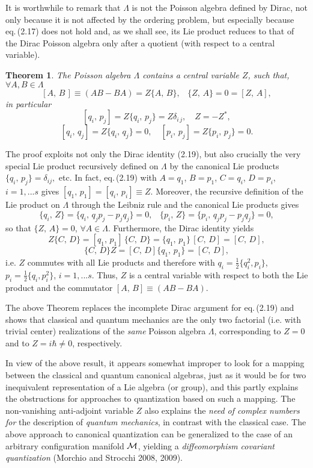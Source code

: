 \documentclass[12pt]{article}
\newtheorem{Theorem}{Theorem}[section]
\def \be {\begin{equation}}
\def \ee {\end{equation}}
\def \ume {{\scriptstyle{\frac{1}{2}}}}
\def \eqq {\equiv}
\def \M {{\cal M}}
\begin{document}
It is worthwhile to remark that $\Lambda$ is not the Poisson algebra defined by Dirac, not only because it is not affected by the ordering problem, but especially  because eq.\,(2.17) does not hold and, as we shall see,  its   Lie product reduces to that of the Dirac Poisson algebra only after  a quotient (with respect to a central variable). 
 
 \begin{Theorem} The Poisson algebra $\Lambda$ contains a central variable $Z $, such that, $\forall A, B \in \Lambda$ 
\be{ [ A, \,B \,] \eqq (A B - B A) = Z \{ A, \,B \}, \,\,\,\,\,\{ Z, \,A \} = 0 = [ Z, \, A],}\ee
in particular 
\be{ [ q_i, \,p_j ] = Z  \{ q_i, \, p_j \} = Z \delta_{i \,j},\,\,\,\,\,\,Z = - Z^*, }\ee $$ [ q_i, \,q_j ] = Z \{ q_i,\, q_j \} = 0,\,\,\,\,\,\,[ p_i, \,p_j ]  =  Z \{ p_i,\, p_j \}  = 0.$$
 \end{Theorem}    
The proof exploits not only the Dirac identity (2.19), but also crucially the very special Lie product recursively defined on $\Lambda$ by the canonical Lie products $\{ q_i, \,p_j \} = \delta_{i j }, $ etc. 
In fact, eq.\,(2.19) with $A = q_1$, $B = p_1$, $C = q_i$, $D = p_i$, $i = 1, ...s$ gives
$[ q_1, \,p_1 ] = [ q_i,\, p_i ] \eqq Z. $ 
Moreover, the recursive definition of the Lie product on $\Lambda$  through the Leibniz rule and the canonical Lie products gives $$ \{ q_i, \, Z \} = \{ q_i, \,q_j p_j - p_j q_j \} = 0, \, \,\,\,\,\{ p_i, \, Z \} = \{ p_i, \, q_j p_j - p_j q_j \} = 0,$$ 
so that $\{ Z, \,A \} = 0$, $ \forall A \in \Lambda$. 
Furthermore, the Dirac identity yields $$ Z \{ C,\, D \} = [ q_1, \, p_1 ]\, \{ C,\, D \} = \{ q_1, \, p_1 \} \, [ C,\, D ] = [ C,\, D ], $$   $$\{ C,\, D \} Z =  [ C,\, D ] \{ q_1, \,p_1 \} = [ C, \, D ],$$ i.e. $Z$ commutes with all Lie products and therefore with $ q_i = \ume \{ q_i^2, p_i \}$,  $p_i = \ume \{ q_i, p_i^2 \}$, $i = 1,...s$. Thus,  $Z$ is a central variable with respect to both the Lie product and the commutator $[ A,\, B ] \eqq (A B - B A)$. 

\vspace{1mm} The above Theorem replaces the incomplete Dirac argument for eq.\,(2.19) and shows that classical and quantum mechanics are the only two factorial (i.e. with trivial center) realizations of the {\em same} Poisson algebra $\Lambda$, corresponding to $Z = 0$ and to $Z = i \hbar \neq 0$, respectively.
 
\def \cm {$C^\infty(\M)$}
\def \vm {Vect\,$(\M)$\,}

In view of the above result,  it appears somewhat improper to look for a mapping between the  classical and quantum canonical algebras, just as it would be for two inequivalent representation of a Lie algebra (or group),  and  this partly explains the obstructions for approaches to quantization based on  such a mapping. 
The non-vanishing anti-adjoint  variable $Z$ also explains the {\em need of complex numbers for} the description of {\em quantum mechanics}, in contrast with  the classical case. 
The above approach to canonical quantization can be generalized to the case of an arbitrary configuration manifold $\M$, yielding   a {\em diffeomorphism covariant quantization} (Morchio and Strocchi 2008, 2009). 
\end{document}
